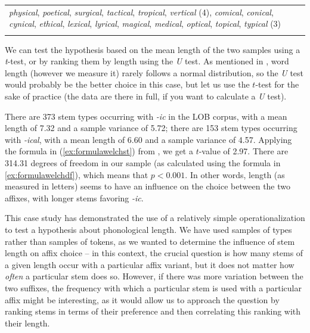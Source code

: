 \begin{table}
\begin{tabularx}{\textwidth}{Q}
\textit{physical}, \textit{poetical}, \textit{surgical}, \textit{tactical}, \textit{tropical}, \textit{vertical} (4), \textit{comical}, \textit{conical}, \textit{cynical}, \textit{ethical}, \textit{lexical}, \textit{lyrical}, \textit{magical}, \textit{medical}, \textit{optical}, \textit{topical}, \textit{typical} (3)\\
\lspbottomrule
\end{tabularx}
\end{table}

We can test the hypothesis based on the mean  length  of the two samples using a \textit{t}-test,  or by ranking them by length using the \textit{U} test. As mentioned in , word length (however we measure  it) rarely follows a normal distribution,  so the \textit{U} test would probably be the better choice in this case, but let us use the $t$\hyp{}test for the sake of practice (the data are there in full, if you want to calculate a \textit{U} test).

There are 373 stem types  occurring with \textit{-ic} in the LOB  corpus, with a mean  length  of 7.32 and a sample variance  of 5.72; there are 153 stem types occurring with \textit{-ical}, with a mean length of 6.60 and a sample variance of 4.57. Applying the formula in (\ref{ex:formulawelchst}) from , we get a $t$-value of 2.97. There are 314.31 degrees of freedom in our sample (as calculated using the formula in \ref{ex:formulawelchdf}), which means that $p < 0.001$. In other words, length  (as measured  in letters) seems to have an influence on the choice between the two affixes,  with longer stems  favoring \textit{-ic}.

This case study has demonstrated the use of a relatively simple operationalization  to test a hypothesis about phonological length.  We have used samples of types  rather than samples of tokens,  as we wanted to determine the influence of stem  length on affix  choice -- in this context, the crucial question is how many stems of a given length  occur with a particular affix  variant, but it does not matter how \textit{often} a particular stem  does so. However, if there was more variation  between the two suffixes,  the frequency with which a particular stem is used with a particular affix might be interesting, as it would allow us to approach the question by ranking stems  in terms of their preference and then correlating  this ranking with their  length.

